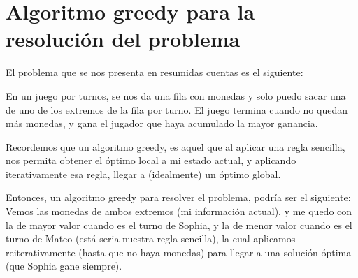 \section{Algoritmo greedy para la resolución del problema}

El problema que se nos presenta en resumidas cuentas es el siguiente:

En un juego por turnos, se nos da una fila con monedas y solo puedo sacar una de uno de los extremos de la fila por turno. El juego termina cuando no quedan más monedas, y gana el jugador que haya acumulado la mayor ganancia.

Recordemos que un algoritmo greedy, es aquel que al aplicar una regla sencilla, nos permita obtener el óptimo local a mi estado actual, y aplicando iterativamente esa regla, llegar a (idealmente) un óptimo global.

Entonces, un algoritmo greedy para resolver el problema, podría ser el siguiente: Vemos las monedas de ambos extremos (mi información actual), y me quedo con la de mayor valor cuando es el turno de Sophia, y la de menor valor cuando es el turno de Mateo (está seria nuestra regla sencilla), la cual aplicamos reiterativamente (hasta que no haya monedas) para llegar a una solución óptima (que Sophia gane siempre).